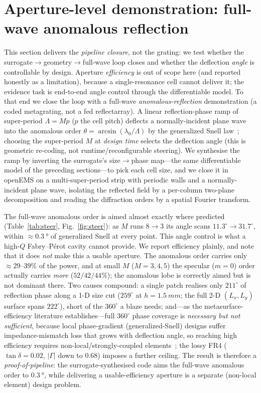 \documentclass[11pt]{article}
\begin{document}
\section{Aperture-level demonstration: full-wave anomalous reflection}\label{sec:steer}
This section delivers the \emph{pipeline closure}, not the grating: we test whether the
surrogate$\to$geometry$\to$full-wave loop closes and whether the deflection \emph{angle} is controllable by
design. Aperture \emph{efficiency} is out of scope here (and reported honestly as a limitation),
because a single-resonance cell cannot deliver it; the evidence task is end-to-end angle control through the
differentiable model. To that end we close the loop with a full-wave \emph{anomalous-reflection}
demonstration (a coded metagrating, not a fed reflectarray). A linear reflection-phase ramp of
super-period $\Lambda=Mp$ ($p$ the cell pitch) deflects a normally-incident plane wave into the anomalous
order $\theta=\arcsin(\lambda_0/\Lambda)$ by the generalized Snell law~\cite{yu2011,sun2012}; choosing the
super-period $M$ at \emph{design time} selects the deflection angle (this is geometric re-coding, not
runtime/reconfigurable steering). We synthesise the ramp by inverting the surrogate's size$\to$phase
map---the same differentiable model of the preceding sections---to pick each cell size, and we close it in
openEMS on a multi-super-period strip with periodic walls and a normally-incident plane wave, isolating
the reflected field by a per-column two-plane decomposition and reading the diffraction orders by a
spatial Fourier transform.

The full-wave anomalous order is aimed almost exactly where predicted
(Table~\ref{tab:steer}, Fig.~\ref{fig:steer}): as $M$ runs $8\!\to\!3$ its angle scans
$11.3^\circ\!\to\!31.7^\circ$, within $\approx\!\SI{0.3}{\degree}$ of generalized Snell at every point.
This angle control is what a high-$Q$ Fabry--P\'erot cavity cannot provide. We report efficiency plainly,
and note that it does \emph{not} make this a usable aperture. The anomalous order carries only
$\approx\!29$--$39\%$ of the power, and at small $M$ ($M\!=\!3,4,5$) the specular ($m{=}0$) order actually
carries \emph{more} ($52/42/44\%$); the anomalous lobe is correctly aimed but is not dominant there. Two
causes compound: a single patch realises only $211^\circ$ of reflection phase along a 1-D size cut
($259^\circ$ at $h{=}\SI{1.5}{mm}$; the full 2-D $(L_x,L_y)$ surface spans $222^\circ$), short of the
$360^\circ$ a blaze needs; and---as the metasurface-efficiency
literature establishes---full $360^\circ$ phase coverage is \emph{necessary but not sufficient}, because
local phase-gradient (generalized-Snell) designs suffer impedance-mismatch loss that grows with
deflection angle, so reaching high efficiency requires non-local/strongly-coupled
elements~\cite{diazrubio2017}; the lossy FR4 ($\tan\delta=0.02$, $|\Gamma|$ down to $0.68$) imposes a
further ceiling. The result is therefore a \emph{proof-of-pipeline}: the surrogate-synthesised code aims
the full-wave anomalous order to $\SI{0.3}{\degree}$, while delivering a usable-efficiency aperture is a
separate (non-local element) design problem.
\end{document}
